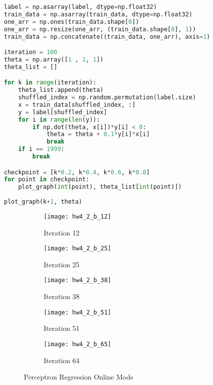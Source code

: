 \documentclass[11pt]{article}
\begin{document}
\begin{enumerate}[label=(\alph*)]
\begin{enumerate}[label=(\roman*)]
\begin{lstlisting}[language=Python, showstringspaces=false]
label = np.asarray(label, dtype=np.float32)
train_data = np.asarray(train_data, dtype=np.float32)
one_arr = np.ones(train_data.shape[0])
one_arr = np.resize(one_arr, (train_data.shape[0], 1))
train_data = np.concatenate((train_data, one_arr), axis=1)

iteration = 100
theta = np.array([1 , 1, 1])
theta_list = []

for k in range(iteration):
    theta_list.append(theta)
    shuffled_index = np.random.permutation(label.size) 
    x = train_data[shuffled_index, :] 
    y = label[shuffled_index] 
    for i in range(len(y)):
        if np.dot(theta, x[i])*y[i] < 0:
            theta = theta + 0.1*y[i]*x[i]
            break
    if i == 1999:
        break

checkpoint = [k*0.2, k*0.4, k*0.6, k*0.8]
for point in checkpoint:
    plot_graph(int(point), theta_list[int(point)])
        
plot_graph(k+1, theta)
\end{lstlisting}

\begin{figure}[H]
\begin{subfigure}{.5\textwidth}
  \centering
  \texttt{[image: hw4\_2\_b\_12]}
  \caption{Iteration 12}
  \label{fig:hw4_2_b_12}
\end{subfigure}
\begin{subfigure}{.5\textwidth}
  \centering
  \texttt{[image: hw4\_2\_b\_25]}
  \caption{Iteration 25}
  \label{fig:hw4_2_b_25}
\end{subfigure}

\begin{subfigure}{.5\textwidth}
  \centering
  \texttt{[image: hw4\_2\_b\_38]}
  \caption{Iteration 38}
  \label{fig:hw4_2_b_38}
\end{subfigure}
\begin{subfigure}{.5\textwidth}
  \centering
  \texttt{[image: hw4\_2\_b\_51]}
  \caption{Iteration 51}
  \label{fig:hw4_2_b_51}
\end{subfigure}
\begin{subfigure}{.5\textwidth}
  \centering
  \texttt{[image: hw4\_2\_b\_65]}
  \caption{Iteration 64}
  \label{fig:hw4_2_b_65}
\end{subfigure}

\caption{Perceptron  Regression Online Mode}
\label{fig:hw4_2_b_1}
\end{figure}

\newpage


\end{enumerate}
\end{enumerate}
\end{document}
